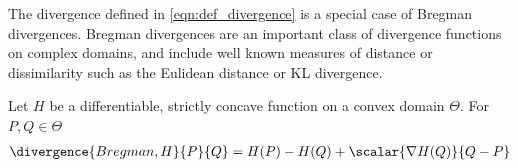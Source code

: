 
The divergence defined in \eqref{eqn:def_divergence} is a special case of Bregman divergences. Bregman divergences are an important class of divergence functions on complex domains, and include well known measures of distance or dissimilarity such as the Eulidean distance or KL divergence.

\begin{definition}
	Let $H$ be a differentiable, strictly concave function on a convex domain $\Theta$. For $P,Q\in\Theta$ 
	\begin{align}
		\divergence{Bregman,H}{P}{Q} = H(P) - H(Q) + \scalar{\nabla H(Q)}{Q-P}
	\end{align}
\end{definition}

